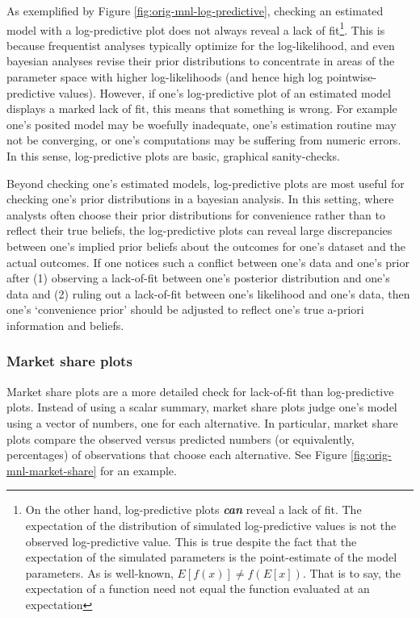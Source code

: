 \documentclass[preprint]{elsarticle}
\begin{document}
As exemplified by Figure \ref{fig:orig-mnl-log-predictive}, checking an estimated model with a log-predictive plot does not always reveal a lack of fit\footnote{On the other hand, log-predictive plots \textbf\textit{{can}} reveal a lack of fit. The expectation of the distribution of simulated log-predictive values is not the observed log-predictive value. This is true despite the fact that the expectation of the simulated parameters is the point-estimate of the model parameters. As is well-known, $ E \left[ f \left( x \right) \right] \neq f \left( E \left[ x \right] \right)$. That is to say, the expectation of a function need not equal the function evaluated at an expectation}. This is because frequentist analyses typically optimize for the log-likelihood, and even bayesian analyses revise their prior distributions to concentrate in areas of the parameter space with higher log-likelihoods (and hence high log pointwise-predictive values). However, if one's log-predictive plot of an estimated model displays a marked lack of fit, this means that something is wrong. For example one's posited model may be woefully inadequate, one's estimation routine may not be converging, or one's computations may be suffering from numeric errors. In this sense, log-predictive plots are basic, graphical sanity-checks.

Beyond checking one's estimated models, log-predictive plots are most useful for checking one's prior distributions in a bayesian analysis. In this setting, where analysts often choose their prior distributions for convenience rather than to reflect their true beliefs, the log-predictive plots can reveal large discrepancies between one's implied prior beliefs about the outcomes for one's dataset and the actual outcomes. If one notices such a conflict between one's data and one's prior after (1) observing a lack-of-fit between one's posterior distribution and one's data and (2) ruling out a lack-of-fit between one's likelihood and one's data, then one's `convenience prior' should be adjusted to reflect one's true a-priori information and beliefs.

\subsubsection{Market share plots}
\label{sec:case1-part1-ms-plots}
Market share plots are a more detailed check for lack-of-fit than log-predictive plots. Instead of using a scalar summary, market share plots judge one's model using a vector of numbers, one for each alternative. In particular, market share plots compare the observed versus predicted numbers (or equivalently, percentages) of observations that choose each alternative. See Figure \ref{fig:orig-mnl-market-share} for an example.
\end{document}
